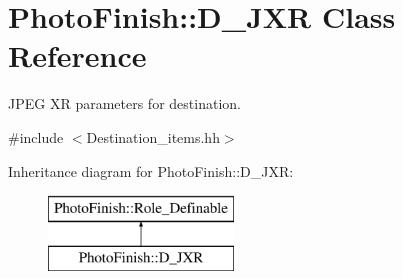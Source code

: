\hypertarget{class_photo_finish_1_1_d___j_x_r}{}\section{Photo\+Finish\+:\+:D\+\_\+\+J\+XR Class Reference}
\label{class_photo_finish_1_1_d___j_x_r}


J\+P\+EG XR parameters for destination.  




{\ttfamily \#include $<$Destination\+\_\+items.\+hh$>$}

Inheritance diagram for Photo\+Finish\+:\+:D\+\_\+\+J\+XR\+:\begin{figure}[H]
\begin{center}
\leavevmode
\includegraphics[height=2.000000cm]{class_photo_finish_1_1_d___j_x_r}
\end{center}
\end{figure}

